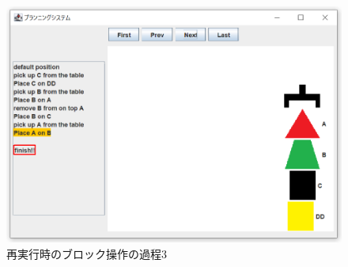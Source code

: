 \documentclass[12pt]{jarticle}
\begin{document}
\begin{figure}[htbp]
  \begin{center}
    \includegraphics[scale=0.6]{images/page12.PNG}
    \caption{再実行時のブロック操作の過程3}
    \label{fig:page12}
  \end{center}
\end{figure}
\end{document}
